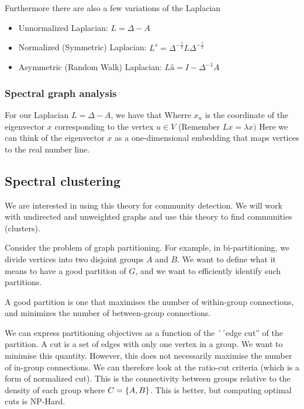     Furthermore there are also a few variations of the Laplacian
    \begin{itemize}
        \item Unnormalized Laplacian: $L = \Delta - A$
        \item Normalized (Symmetric) Laplacian: $L^s = \Delta^{- \frac{1}{2}}L \Delta^{-\frac{1}{2}}$
        \item Asymmetric (Random Walk) Laplacian: $Lâ = I - \Delta^{-1}A$
    \end{itemize}
    
\subsubsection{Spectral graph analysis}
    For our Laplacian $L = \Delta - A$, we have that
    Wherre $x_u$ is the coordinate of the eigenvector $x$ corresponding to the vertex $u \in V$ (Remember $Lx = \lambda x)$
    Here we can think of the eigenvector $x$ as a one-dimensional embedding that maps vertices to the real number line.
    
    
\subsection{Spectral clustering}
    We are interested in using this theory for community detection. We will work with undirected and unweighted graphs and use this theory to find communities (clusters). 
    
    Consider the problem of graph partitioning. For example, in bi-partitioning, we divide vertices into two disjoint groups $A$ and $B$. We want to define what it means to have a good partition of $G$, and we want to efficiently identify such partitions. 
    
    A good partition is one that maximises the number of within-group connections, and minimizes the number of between-group connections. 
    
    We can express partitioning objectives as a function of the ´´edge cut'' of the partition. A cut is a set of edges with only one vertex in a group. 
    We want to minimise this quantity. However, this does not necessarily maximise the number of in-group connections. We can therefore look at the ratio-cut criteria (which is a form of normalized cut). This is the connectivity between groups relative to the density of each group 
    where $C = \{A, B\}$. This is better, but computing optimal cuts is NP-Hard. 
    
